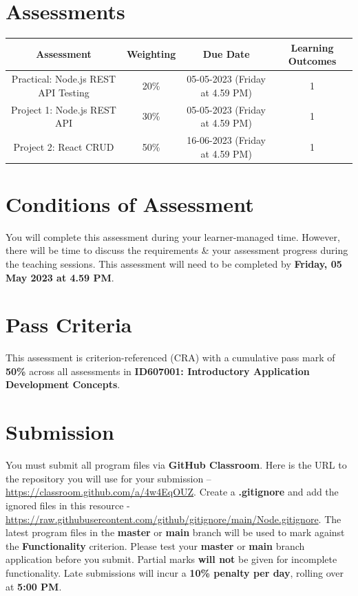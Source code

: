 \documentclass{article}
\begin{document}
\section*{Assessments}
\renewcommand{\arraystretch}{1.5}
\begin{tabular}{|c|c|c|c|}
	\hline
	\textbf{Assessment}                                 & \textbf{Weighting} & \textbf{Due Date}            & \textbf{Learning Outcomes} \\ \hline
	\small Practical: Node.js REST API Testing & \small 20\%        & \small 05-05-2023 (Friday at 4.59 PM)   & \small 1                   \\ \hline
	\small Project 1: Node.js REST API                  & \small 30\%        & \small \small 05-05-2023 (Friday at 4.59 PM) & \small 1                   \\ \hline
	\small Project 2: React CRUD                        & \small 50\%        & \small 16-06-2023 (Friday at 4.59 PM)  & \small 1                   \\ \hline
\end{tabular}

\section*{Conditions of Assessment}
You will complete this assessment during your learner-managed time. However, there will be time to discuss the requirements \& your assessment progress during the teaching sessions. This assessment will need to be completed by \textbf{Friday, 05 May 2023 at 4.59 PM}.

\section*{Pass Criteria}
This assessment is criterion-referenced (CRA) with a cumulative pass mark of \textbf{50\%} across all assessments in \textbf{ID607001: Introductory Application Development Concepts}.

\section*{Submission}
You must submit all program files via \textbf{GitHub Classroom}. Here is the URL to the repository you will use for your submission – \href{https://classroom.github.com/a/4w4EqOUZ}{https://classroom.github.com/a/4w4EqOUZ}.  Create a \textbf{.gitignore} and add the ignored files in this resource - \href{https://raw.githubusercontent.com/github/gitignore/main/Node.gitignore}{https://raw.githubusercontent.com/github/gitignore/main/Node.gitignore}. The latest program files in the \textbf{master} or \textbf{main} branch will be used to mark against the \textbf{Functionality} criterion. Please test your \textbf{master} or \textbf{main} branch application before you submit. Partial marks \textbf{will not} be given for incomplete functionality. Late submissions will incur a \textbf{10\% penalty per day}, rolling over at \textbf{5:00 PM}.
\end{document}
